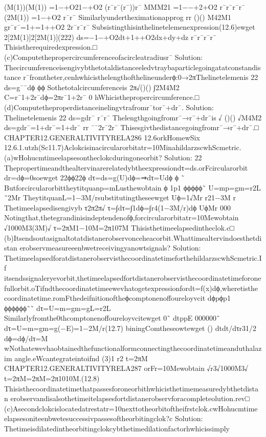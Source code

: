 {{{{{{{{{{{{{{{{(M(1))(M(1))
=1−+O21−+O2
(r¯r¯(r¯))r¯
MMM21
=1−−+2+O2
r¯r¯r¯r¯
(2M(1))
=1−+O2
r¯r¯
Similarlyundertheximationapprog
rr
()()
M42M1
gr¯r¯=1+=1++O2
2r¯r¯r¯
Subsistingthisinthelinetelemenexpression(12.6)ewget
2[2M(1)]2[2M(1)](222)
ds=−1−+O2dt+1++O2dx+dy+dz
r¯r¯r¯r¯
Thisistherequiredexpression.□
(c)Computethepropercircumferenceofacircleatradiusr¯
Solution:
Thecircumferenceisengivybthetotaldistanceeledvtraybaparticlegoingatatconstandistance
r¯fromtheter,cenhwhicisthelengthofthelineunderϕ:0→2πThelinetelemenis
22
ds=g¯¯dϕ
ϕϕ
Sothetotalcircumferenceis
2π√()()
∫2M4M2
C=r¯1+2r¯dϕ=2πr¯1+2r¯
0
hWhicisthepropercircumference.□
(d)Computetheproperdistanceinelingvtrafromr¯tor¯+dr¯.
Solution:
Thelinetelemenis
22
ds=gdr¯
r¯r¯
Thelengthgoingfromr¯→r¯+dr¯is
√
()()
√M4M2
ds=gdr¯=1+dr¯=1+dr¯
rr
¯¯2r¯2r¯
Thisesgivthedistancegoingfromr¯→r¯+dr¯.□
CHAPTER12.GENERALTIVITYRELA286
12.6orkHomewSix
12.6.1.utzh(Sc11.7)Aclokcisinacircularorbitatr=10MinahildarzscwhScmetric.
(a)wHohucmtimeelapsesontheclokcduringoneorbit?
Solution:
22
Thepropertimeandthealtervinarerelatedybtheexpressiondτ=ds.orFcircularorbit
dr=dϕ=0soewget
22ϕϕ22ϕ
dτ=ds=g(U)dϕ=⇒dτ=Udϕ
ϕ
˜
Butforcircularorbittheytitquanp=mLusthewobtain
ϕ
1p1
ϕϕϕϕϕ˜
U=mp=gm=r2L
˜2Mr
TheytitquanL=1−3M/rsubstitutingtheseewget
Uϕ=1√Mr
r21−3M
r
Thetimeelapsedisengivyb
τ2π2π√
τ=∫dτ=∫1dϕ=∫r4(1−3M/r)dϕ
UϕMr
000
Notingthat,thetegrandinisindeptendenofϕ,forcircularorbitatr=10Mewobtain
√1000M3(3M)√
τ=2πM1−10M=2π107M
Thisisthetimeelapsedintheclok.c□
(b)Itsendsoutasignaltotatdistanerobservonceheacorbit.Whattimealtervindoesthetdistan
erobservmeasureeenbwetreceivingyanowtsignals?
Solution:
ThetimeelapsedforatdistanerobservisthecoordinatetimeforthehildarzscwhScmetric.If
itsendssignaleryevorbit,thetimeelapsedfortdistanerobservisthecoordinatetimeforone
fullorbit.oTifndthecoordinatetimeewevhatogetexpressionfordt=f(x)dϕ,wheretisthe
coordinatetime.romFthedeifnitionoftheϕcomptonenoffoureloyvcit
dϕpϕp1
ϕϕϕϕϕϕ˜˜
dτ=U=m=gm=gL=r2L
Similarlyfromthe0thcomptonenoffoureloyvcitewget
0˜
dtppE
000000˜
dτ=U=m=gm=g(−E)=1−2M/r(12.7)
biningComtheseowtewget
()
dtdt/dτr31/2
dϕ=dϕ/dτ=M
wNothatewevhaobtainedthefunctionalformconnectingthecoordinatetimeanduthalazim
angle.eWcantegrateintoifnd
(3)1
r2
t=2πM
CHAPTER12.GENERALTIVITYRELA287
orFr=10Mewobtain
√r3√1000M3√
t=2πM=2πM=2π1010M.(12.8)
Thisisthecoordinatetimethatpassesforoneorbithwhicisthetimemeasuredybthetdistan
erobservandisalsothetimeitelapsesfortdistanerobservforacompleteolution.rev□
(c)Asecondclokcislocatedatrestatr=10nexttotheorbitoftheifrstclok.cwHohucmtime
elapsesoniteenbwetesuccessivpassesoftheorbitingclok?c
Solution:
Thetimeisdilatedintheorbitingclokcybthetimedilationfactorhwhicissimply
}}}}}}}}}}}}}}}}
